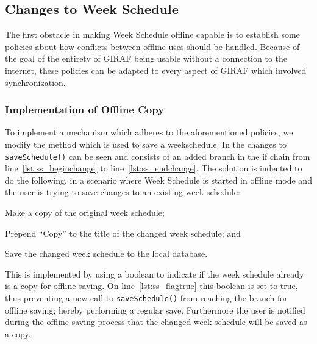 \subsection{Changes to Week Schedule}
The first obstacle in making Week Schedule offline capable is to establish some policies about how conflicts between offline uses should be handled.
Because of the goal of the entirety of GIRAF being usable without a connection to the internet, these policies can be adapted to every aspect of GIRAF which involved synchronization.



\subsubsection{Implementation of Offline Copy}
To implement a mechanism which adheres to the aforementioned policies, we modify the method which is used to save a weekschedule.
In  the changes to \texttt{saveSchedule()} can be seen and consists of an added branch in the if chain from line~\ref{lst:ss_beginchange} to line~\ref{lst:ss_endchange}.
The solution is indented to do the following, in a scenario where Week Schedule is started in offline mode and the user is trying to save changes to an existing week schedule: 
\begin{enumberate*}
\item Make a copy of the original week schedule;
\item Prepend \enquote{Copy} to the title of the changed week schedule; and
\item Save the changed week schedule to the local database.  
\end{enumberate*}

This is implemented by using a boolean to indicate if the week schedule already is a copy for offline saving.
On line~\ref{lst:ss_flagtrue} this boolean is set to true, thus preventing a new call to \texttt{saveSchedule()} from reaching the branch for offline saving; hereby performing a regular save.
Furthermore the user is notified during the offline saving process that the changed week schedule will be saved as a copy.

